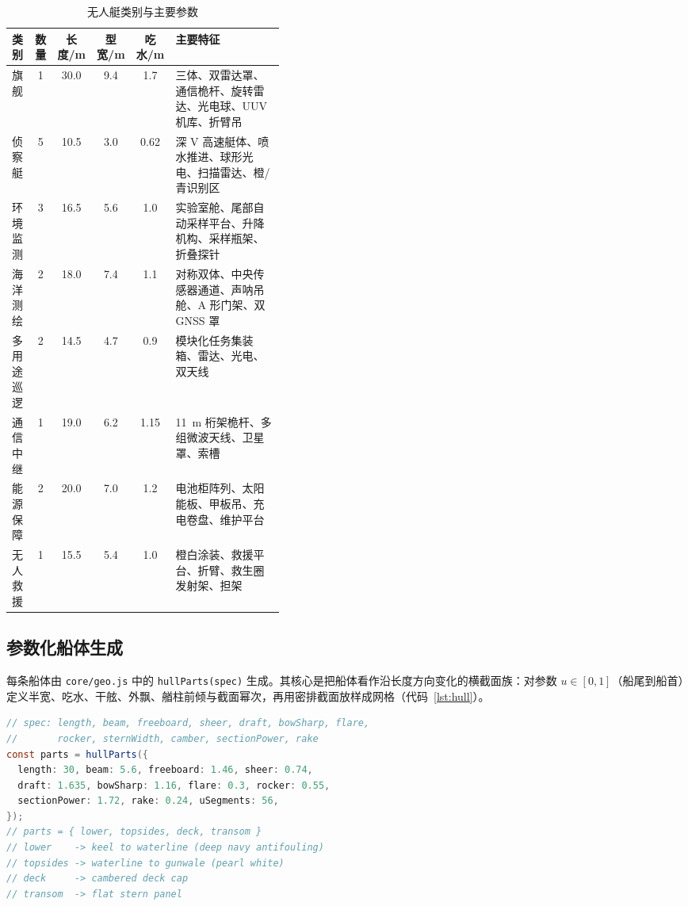 \documentclass[UTF8, a4paper, 11pt]{ctexart}
\newcommand{\file}[1]{\texttt{#1}}
\begin{document}
\begin{table}[H]
\centering
\caption{无人艇类别与主要参数}
\label{tab:boats}
\small
\begin{tabular}{@{}lccccp{0.40\linewidth}@{}}
\toprule
\textbf{类别} & \textbf{数量} & \textbf{长度}/m & \textbf{型宽}/m & \textbf{吃水}/m & \textbf{主要特征} \\
\midrule
旗舰 & 1 & 30.0 & 9.4 & 1.7 & 三体、双雷达罩、通信桅杆、旋转雷达、光电球、UUV 机库、折臂吊 \\
侦察艇 & 5 & 10.5 & 3.0 & 0.62 & 深 V 高速艇体、喷水推进、球形光电、扫描雷达、橙/青识别区 \\
环境监测 & 3 & 16.5 & 5.6 & 1.0 & 实验室舱、尾部自动采样平台、升降机构、采样瓶架、折叠探针 \\
海洋测绘 & 2 & 18.0 & 7.4 & 1.1 & 对称双体、中央传感器通道、声呐吊舱、A 形门架、双 GNSS 罩 \\
多用途巡逻 & 2 & 14.5 & 4.7 & 0.9 & 模块化任务集装箱、雷达、光电、双天线 \\
通信中继 & 1 & 19.0 & 6.2 & 1.15 & 11~m 桁架桅杆、多组微波天线、卫星罩、索槽 \\
能源保障 & 2 & 20.0 & 7.0 & 1.2 & 电池柜阵列、太阳能板、甲板吊、充电卷盘、维护平台 \\
无人救援 & 1 & 15.5 & 5.4 & 1.0 & 橙白涂装、救援平台、折臂、救生圈发射架、担架 \\
\bottomrule
\end{tabular}
\end{table}

\subsection{参数化船体生成}

每条船体由 \file{core/geo.js} 中的 \texttt{hullParts(spec)} 生成。其核心是把船体看作沿长度方向变化的横截面族：对参数 $u\in[0,1]$（船尾到船首）定义半宽、吃水、干舷、外飘、艏柱前倾与截面幂次，再用密排截面放样成网格（代码~\ref{lst:hull}）。

\begin{lstlisting}[language=Java, caption={参数化船体截面与船体部件拆分}, label={lst:hull}]
// spec: length, beam, freeboard, sheer, draft, bowSharp, flare,
//       rocker, sternWidth, camber, sectionPower, rake
const parts = hullParts({
  length: 30, beam: 5.6, freeboard: 1.46, sheer: 0.74,
  draft: 1.635, bowSharp: 1.16, flare: 0.3, rocker: 0.55,
  sectionPower: 1.72, rake: 0.24, uSegments: 56,
});
// parts = { lower, topsides, deck, transom }
// lower    -> keel to waterline (deep navy antifouling)
// topsides -> waterline to gunwale (pearl white)
// deck     -> cambered deck cap
// transom  -> flat stern panel
\end{lstlisting}
\end{document}
